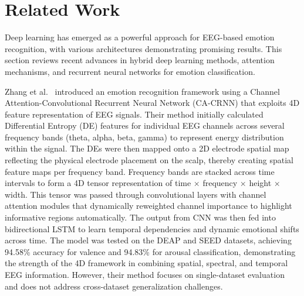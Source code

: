 \documentclass[conference]{IEEEtran}
\begin{document}
\section{Related Work}

Deep learning has emerged as a powerful approach for EEG-based emotion recognition, with various architectures demonstrating promising results. This section reviews recent advances in hybrid deep learning methods, attention mechanisms, and recurrent neural networks for emotion classification.

Zhang et al.~\cite{zhang2025emotion} introduced an emotion recognition framework using a Channel Attention-Convolutional Recurrent Neural Network (CA-CRNN) that exploits 4D feature representation of EEG signals. Their method initially calculated Differential Entropy (DE) features for individual EEG channels across several frequency bands (theta, alpha, beta, gamma) to represent energy distribution within the signal. The DEs were then mapped onto a 2D electrode spatial map reflecting the physical electrode placement on the scalp, thereby creating spatial feature maps per frequency band. Frequency bands are stacked across time intervals to form a 4D tensor representation of time $\times$ frequency $\times$ height $\times$ width. This tensor was passed through convolutional layers with channel attention modules that dynamically reweighted channel importance to highlight informative regions automatically. The output from CNN was then fed into bidirectional LSTM to learn temporal dependencies and dynamic emotional shifts across time. The model was tested on the DEAP and SEED datasets, achieving 94.58\% accuracy for valence and 94.83\% for arousal classification, demonstrating the strength of the 4D framework in combining spatial, spectral, and temporal EEG information. However, their method focuses on single-dataset evaluation and does not address cross-dataset generalization challenges.
\end{document}
